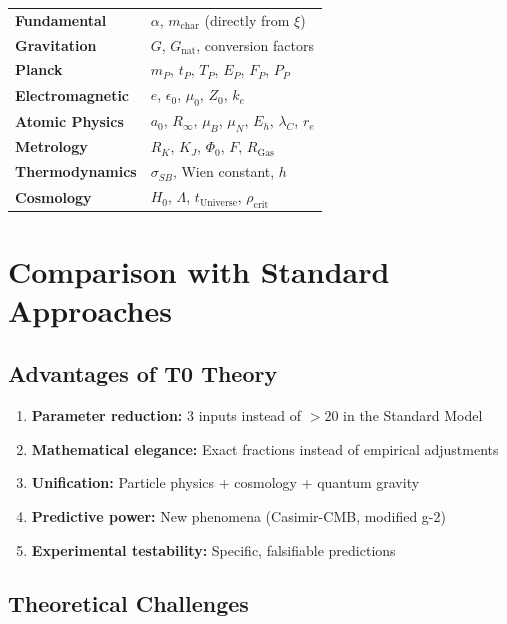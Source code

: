 	\begin{center}
		\begin{tabular}{ll}
			\textbf{Fundamental} & $\alpha$, $m_{\text{char}}$ (directly from $\xi$) \\
			\textbf{Gravitation} & $G$, $G_{\text{nat}}$, conversion factors \\
			\textbf{Planck} & $m_P$, $t_P$, $T_P$, $E_P$, $F_P$, $P_P$ \\
			\textbf{Electromagnetic} & $e$, $\epsilon_0$, $\mu_0$, $Z_0$, $k_e$ \\
			\textbf{Atomic Physics} & $a_0$, $R_\infty$, $\mu_B$, $\mu_N$, $E_h$, $\lambda_C$, $r_e$ \\
			\textbf{Metrology} & $R_K$, $K_J$, $\Phi_0$, $F$, $R_{\text{Gas}}$ \\
			\textbf{Thermodynamics} & $\sigma_{SB}$, Wien constant, $h$ \\
			\textbf{Cosmology} & $H_0$, $\Lambda$, $t_{\text{Universe}}$, $\rho_{\text{crit}}$ \\
		\end{tabular}
	\end{center}
	
	\section{Comparison with Standard Approaches}
	
	\subsection{Advantages of T0 Theory}
	
	\begin{enumerate}
		\item \textbf{Parameter reduction:} 3 inputs instead of $>20$ in the Standard Model
		\item \textbf{Mathematical elegance:} Exact fractions instead of empirical adjustments
		\item \textbf{Unification:} Particle physics + cosmology + quantum gravity
		\item \textbf{Predictive power:} New phenomena (Casimir-CMB, modified g-2)
		\item \textbf{Experimental testability:} Specific, falsifiable predictions
	\end{enumerate}
	
	\subsection{Theoretical Challenges}
	
